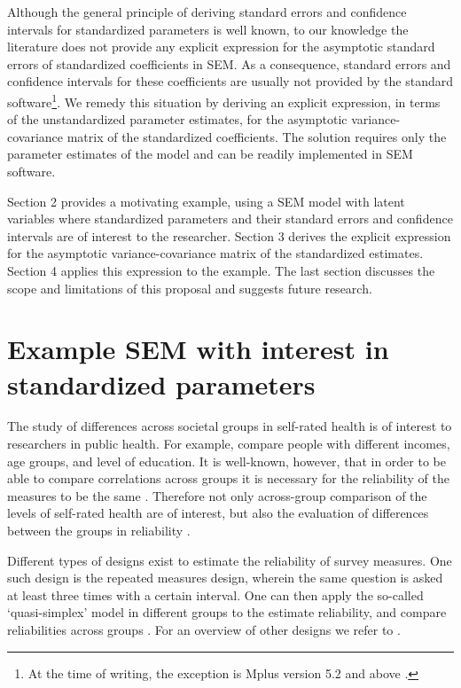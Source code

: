 \documentclass[a4paper, 11pt]{article}
\newcommand{\0}{\boldsymbol{0}}
\begin{document}
Although the general principle of deriving standard errors and confidence intervals for standardized parameters is well known, to our knowledge the literature does not provide any explicit expression for the asymptotic standard errors of standardized coefficients in SEM. As a consequence, standard errors and confidence intervals for these coefficients are usually not provided by the standard software\footnote{At the time of writing, the exception is Mplus version 5.2 and above \citep{muthen1998mplus}.}.  We remedy this situation by deriving an explicit expression, in terms of the unstandardized parameter estimates, for the asymptotic variance-covariance matrix of the standardized coefficients. The solution requires only the parameter estimates of the model and can be readily implemented in SEM software.

Section 2 provides a motivating example, using a SEM model with latent
variables where standardized parameters and their standard errors and confidence
intervals are of interest to the researcher.
Section 3 derives the explicit expression for the asymptotic variance-covariance matrix of the standardized estimates. Section 4 applies this expression to the example. The last section discusses the scope and limitations of this proposal and suggests future research.


\section{Example SEM with interest in standardized parameters} 


The study of differences across societal groups in self-rated health is of interest to researchers in public health.   For example,  \cite{von2006education} 
compare people with different incomes, age groups, and level of education.
It is well-known, however, that in order to be able to compare correlations across groups it is necessary for the reliability of 
the measures to be the same \citep[e.g.][]{saris_design_2007}. Therefore not only across-group comparison of the levels of self-rated health are of interest, 
but also the evaluation of differences between the groups in reliability \citep{lundberg1996assessing}. 

Different types of designs exist to estimate the reliability of survey measures. One such design is the repeated measures design, wherein the
same question is asked at least three times with a certain interval. One can then apply the so-called `quasi-simplex' model in different groups to the estimate
reliability, and compare reliabilities across groups \citep{heise1970validity,wiley35wiley}. For an overview of other designs we refer to \cite{alwin_margins_2007}. 
\end{document}
